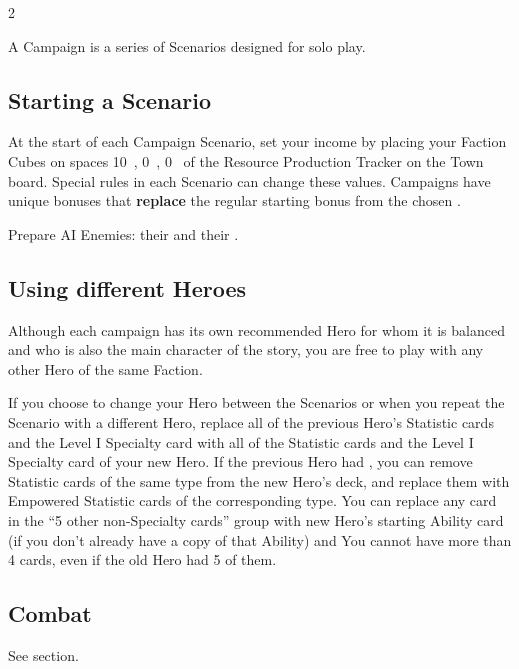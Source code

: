 
\begin{multicols*}{2}

A Campaign is a series of Scenarios designed for solo play.

\subsection*{Starting a Scenario}
At the start of each Campaign Scenario, set your income by placing your Faction Cubes on spaces 10~, 0~, 0~ of the Resource Production Tracker on the Town board. Special rules in each Scenario can change these values.
Campaigns have unique bonuses that \textbf{replace} the regular starting bonus from the chosen .

Prepare AI Enemies: their  and their .

\subsection*{Using different Heroes}
Although each campaign has its own recommended Hero for whom it is balanced and who is also the main character of the story, you are free to play with any other Hero of the same Faction.

If you choose to change your Hero between the Scenarios or when you repeat the Scenario with a different Hero,
replace all of the previous Hero’s Statistic cards and the Level I Specialty card with all of the Statistic cards and the Level I Specialty card of your new Hero.
If the previous Hero had ,
you can remove Statistic cards of the same type from the new Hero’s deck, and replace them with Empowered Statistic cards of the corresponding type.
You can replace any card in the ``5 other non-Specialty cards'' group with new Hero’s starting Ability card (if you don't already have a copy of that Ability) and 
You cannot have more than 4  cards, even if the old Hero had 5 of them.

\subsection*{Combat}
See  section.


\end{multicols*}
